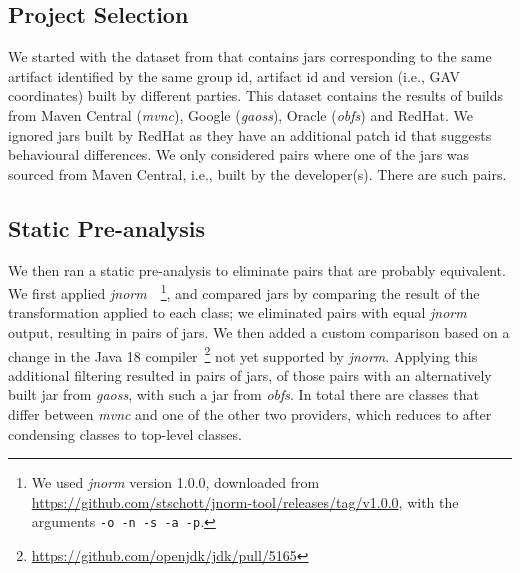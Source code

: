 \documentclass[conference]{IEEEtran}
\newcommand{\inputgen}[1]{\unskip}
\begin{document}
\subsection{Project Selection}

We started with the dataset from \cite{dietrich2024levelsbinaryequivalencecomparison} that contains jars corresponding to the same artifact identified by the same group id, artifact id and version (i.e., GAV coordinates) built by different parties. This dataset contains the results of builds from Maven Central (\textit{mvnc}), Google (\textit{gaoss}), Oracle (\textit{obfs}) and  RedHat. We ignored jars built by RedHat as they have an additional patch id that suggests behavioural differences.  We only considered pairs where one of the jars was sourced from Maven Central, i.e., built by the developer(s). There are \inputgen{num-pairs-of-binaries} such pairs.


\subsection{Static Pre-analysis}

We then ran a static pre-analysis to eliminate pairs that are probably equivalent. We first applied \textit{jnorm}~\cite{schott2024JNorm}~\footnote{We used \textit{jnorm} version 1.0.0, downloaded from \url{https://github.com/stschott/jnorm-tool/releases/tag/v1.0.0}, with the arguments \texttt{-o -n -s -a -p}.}, and compared jars by comparing the result of the transformation applied to each class; we eliminated pairs with equal \textit{jnorm} output, resulting in \inputgen{num-jar-pairs-after-jnorm2} pairs of jars. We then added a custom comparison based on a change in the Java 18 compiler~\footnote{\url{https://github.com/openjdk/jdk/pull/5165}} not yet supported by \textit{jnorm}. Applying this additional filtering resulted in \inputgen{num-jar-pairs-after-invokevirtual-invokeinterface} pairs of jars, \inputgen{num-jar-pairs-after-invokevirtual-invokeinterface-gaoss} of those pairs with an alternatively built jar from \textit{gaoss}, \inputgen{num-jar-pairs-after-invokevirtual-invokeinterface-obfs} with such a jar from \textit{obfs}.
In total there are \inputgen{num-class-pairs-after-invokevirtual-invokeinterface} classes that differ between \textit{mvnc} and one of the other two providers, which reduces to \inputgen{num-top-level-class-pairs-after-invokevirtual-invokeinterface} after condensing classes to top-level classes.
\end{document}
